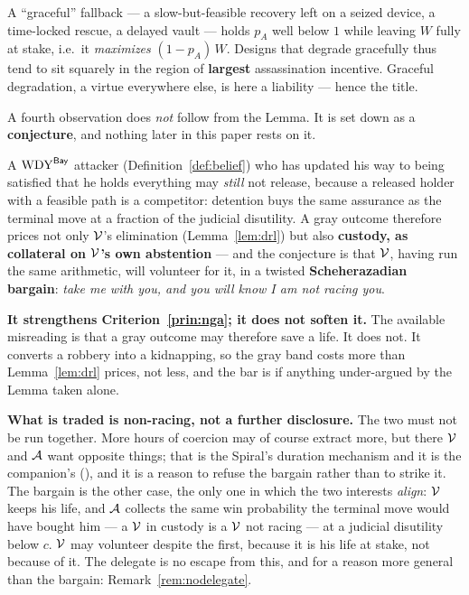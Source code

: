 \begin{remark}\label{rem:danger-peaks}
A ``graceful'' fallback --- a slow-but-feasible recovery left on a seized device,
a time-locked rescue, a delayed vault --- holds $p_A$ well below $1$ while leaving
$W$ fully at stake, i.e.\ it \emph{maximizes} $(1 - p_A)\,W$. Designs that degrade
gracefully thus tend to sit squarely in the region of \textbf{largest}
assassination incentive. Graceful degradation, a virtue everywhere else, is here a
liability --- hence the title.
\end{remark}

\noindent A fourth observation does \emph{not} follow from the Lemma. It is
set down as a \textbf{conjecture}, and nothing later in this paper rests on it.

\begin{remark}\label{rem:scheherazade}
A $\mathrm{WDY}^{\mathsf{Bay}}$ attacker (Definition~\ref{def:belief}) who has updated his way to
being satisfied that he holds everything may \emph{still} not release, because a
released holder with a feasible path is a competitor: detention buys the same
assurance as the terminal move at a fraction of the judicial disutility. A gray
outcome therefore prices not only $\mathcal{V}$'s elimination (Lemma~\ref{lem:drl})
but also \textbf{custody, as collateral on $\mathcal{V}$'s own abstention} --- and the
conjecture is that $\mathcal{V}$, having run the same arithmetic, will volunteer for
it, in a twisted \textbf{Scheherazadian bargain}: \emph{take me with you, and you
will know I am not racing you}.

\textbf{It strengthens Criterion~\ref{prin:nga}; it does not soften it.} The
available misreading is that a gray outcome may therefore save a life. It does
not. It converts a robbery into a kidnapping, so the gray band costs more than
Lemma~\ref{lem:drl} prices, not less, and the bar is if anything under-argued by
the Lemma taken alone.

\textbf{What is traded is non-racing, not a further disclosure.} The two must
not be run together. More hours of coercion may of course extract more, but
there $\mathcal{V}$ and $\mathcal{A}$ want opposite things; that is the Spiral's
duration mechanism and it is the companion's (\cite[\S4]{denial-spiral}), and it
is a reason to refuse the bargain rather than to strike it. The bargain is the
other case, the only one in which the two interests \emph{align}: $\mathcal{V}$
keeps his life, and $\mathcal{A}$ collects the same win probability the terminal
move would have bought him --- a $\mathcal{V}$ in custody is a $\mathcal{V}$ not racing
--- at a judicial disutility below $c$. $\mathcal{V}$ may volunteer despite the
first, because it is his life at stake, not because of it. The delegate is no
escape from this, and for a reason more general than the bargain:
Remark~\ref{rem:nodelegate}.


\end{remark}
